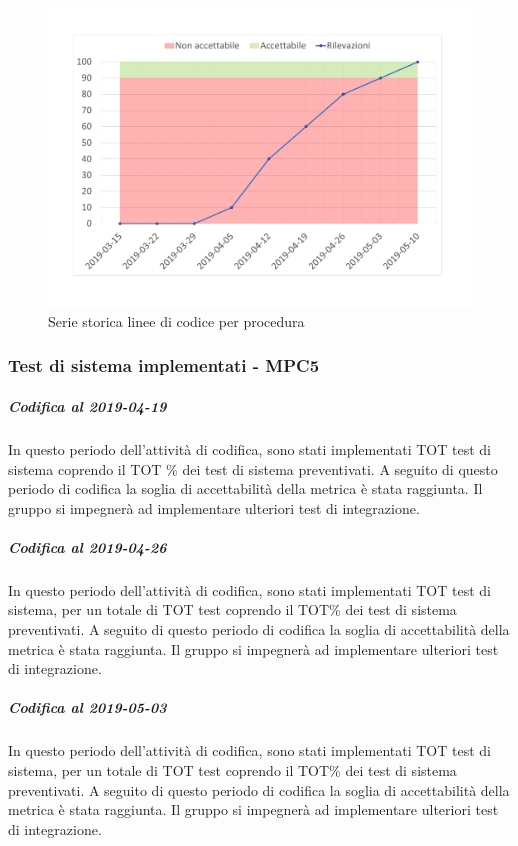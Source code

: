 \begin{figure}[H]
	\centering
	\includegraphics[scale=0.6]{images/resoconto/MPC4Chart.pdf}
	\caption{Serie storica linee di codice per procedura}	
\end{figure}

\subsubsection{Test di sistema implementati - MPC5}
\subparagraph{Codifica al 2019-04-19}
In questo periodo dell'attività di codifica, sono stati implementati TOT test di sistema coprendo il TOT \% dei test di sistema preventivati.
A seguito di questo periodo di codifica la soglia di accettabilità della metrica è stata raggiunta.
Il gruppo si impegnerà ad implementare ulteriori test di integrazione.

\subparagraph{Codifica al 2019-04-26}
In questo periodo dell'attività di codifica, sono stati implementati TOT test di sistema, per un totale di TOT test coprendo il TOT\% dei test di sistema preventivati.
A seguito di questo periodo di codifica la soglia di accettabilità della metrica è stata raggiunta.
Il gruppo si impegnerà ad implementare ulteriori test di integrazione.

\subparagraph{Codifica al 2019-05-03}
In questo periodo dell'attività di codifica, sono stati implementati TOT test di sistema, per un totale di TOT test coprendo il TOT\% dei test di sistema preventivati.
A seguito di questo periodo di codifica la soglia di accettabilità della metrica è stata raggiunta.
Il gruppo si impegnerà ad implementare ulteriori test di integrazione.

